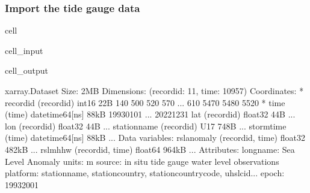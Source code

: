 \documentclass[letterpaper,10pt,english]{jupyterBook}
\begin{document}
\subsubsection{Import the tide gauge data}
\label{\detokenize{notebooks/regional_and_local/SL_anomaly_intra-annual:import-the-tide-gauge-data}}
\begin{sphinxuseclass}{cell}\begin{sphinxVerbatimInput}

\begin{sphinxuseclass}{cell_input}
\begin{sphinxVerbatim}[commandchars=\\\{\}]
   


\end{sphinxVerbatim}

\end{sphinxuseclass}\end{sphinxVerbatimInput}
\begin{sphinxVerbatimOutput}

\begin{sphinxuseclass}{cell_output}
\begin{sphinxVerbatim}[commandchars=\\\{\}]
\PYGZlt{}xarray.Dataset\PYGZgt{} Size: 2MB
Dimensions:       (record\PYGZus{}id: 11, time: 10957)
Coordinates:
  * record\PYGZus{}id     (record\PYGZus{}id) int16 22B 140 500 520 570 ... 610 5470 5480 5520
  * time          (time) datetime64[ns] 88kB 1993\PYGZhy{}01\PYGZhy{}01 ... 2022\PYGZhy{}12\PYGZhy{}31
    lat           (record\PYGZus{}id) float32 44B ...
    lon           (record\PYGZus{}id) float32 44B ...
    station\PYGZus{}name  (record\PYGZus{}id) \PYGZlt{}U17 748B ...
    storm\PYGZus{}time    (time) datetime64[ns] 88kB ...
Data variables:
    rsl\PYGZus{}anomaly   (record\PYGZus{}id, time) float32 482kB ...
    rsl\PYGZus{}mhhw      (record\PYGZus{}id, time) float64 964kB ...
Attributes:
    long\PYGZus{}name:  Sea Level Anomaly
    units:      m
    source:     in situ tide gauge water level observations
    platform:   station\PYGZus{}name, station\PYGZus{}country, station\PYGZus{}country\PYGZus{}code, uhslc\PYGZus{}id...
    epoch:      1993\PYGZhy{}2001
\end{sphinxVerbatim}

\end{sphinxuseclass}\end{sphinxVerbatimOutput}

\end{sphinxuseclass}
\end{document}
